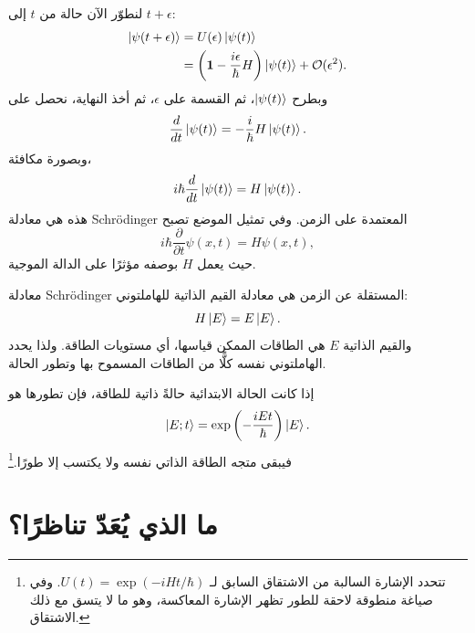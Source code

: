 لنطوّر الآن حالة من \(t\) إلى \(t+\epsilon\):
\begin{align}
\left\lvert\psi(t+\epsilon)\right\rangle
&=
U(\epsilon)\left\lvert\psi(t)\right\rangle
\\
&=
\left(
\mathbf 1-\frac{i\epsilon}{\hbar}H
\right)\left\lvert\psi(t)\right\rangle
+\mathcal O(\epsilon^2).
\end{align}
وبطرح \(\left\lvert\psi(t)\right\rangle\)، ثم القسمة على \(\epsilon\)، ثم أخذ النهاية، نحصل على
\begin{equation}
\frac{d}{dt}\left\lvert\psi(t)\right\rangle
=
-\frac{i}{\hbar}H\left\lvert\psi(t)\right\rangle.
\end{equation}
وبصورة مكافئة،
\begin{equation}
i\hbar\frac{d}{dt}\left\lvert\psi(t)\right\rangle
=
H\left\lvert\psi(t)\right\rangle.
\end{equation}
هذه هي معادلة Schr\"odinger المعتمدة على الزمن. وفي تمثيل الموضع تصبح
\begin{equation}
i\hbar\frac{\partial}{\partial t}\psi(x,t)
=
H\psi(x,t),
\end{equation}
حيث يعمل \(H\) بوصفه مؤثرًا على الدالة الموجية.

معادلة Schr\"odinger المستقلة عن الزمن هي معادلة القيم الذاتية للهاملتوني:
\begin{equation}
H\left\lvert E\right\rangle=E\left\lvert E\right\rangle.
\end{equation}
والقيم الذاتية \(E\) هي الطاقات الممكن قياسها، أي مستويات الطاقة. ولذا يحدد الهاملتوني نفسه كلًّا من الطاقات المسموح بها وتطور الحالة.

إذا كانت الحالة الابتدائية حالةً ذاتية للطاقة، فإن تطورها هو
\begin{equation}
\left\lvert E;t\right\rangle
=
\exp\left(-\frac{iEt}{\hbar}\right)\left\lvert E\right\rangle.
\end{equation}
فيبقى متجه الطاقة الذاتي نفسه ولا يكتسب إلا طورًا.\footnote{تتحدد الإشارة السالبة من الاشتقاق السابق لـ \(U(t)=\exp(-iHt/\hbar)\). وفي صياغة منطوقة لاحقة للطور تظهر الإشارة المعاكسة، وهو ما لا يتسق مع ذلك الاشتقاق.}

\begin{classroomqa}
\end{classroomqa}

\section{ما الذي يُعَدّ تناظرًا؟}

